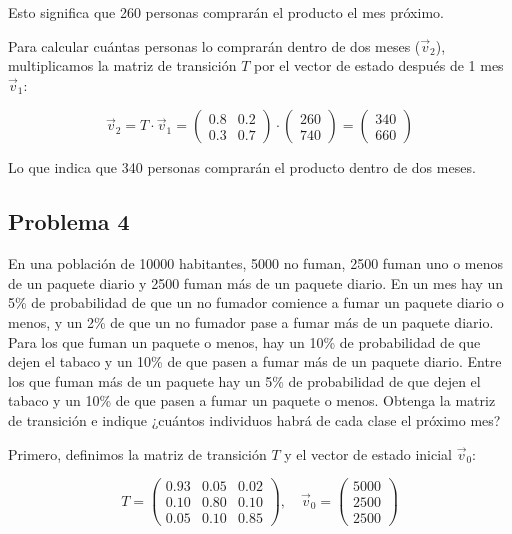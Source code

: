 \documentclass{article}
\begin{document}
Esto significa que 260 personas comprarán el producto el mes próximo.

Para calcular cuántas personas lo comprarán dentro de dos meses (\(\vec{v}_2\)), multiplicamos la matriz de transición \(T\) por el vector de estado después de 1 mes \(\vec{v}_1\):

\[
    \vec{v}_2 = T \cdot \vec{v}_1 = \begin{pmatrix}
        0.8 & 0.2 \\
        0.3 & 0.7
    \end{pmatrix}
    \cdot
    \begin{pmatrix}
        260 \\
        740
    \end{pmatrix}
    =
    \begin{pmatrix}
        340 \\
        660
    \end{pmatrix}
\]

Lo que indica que 340 personas comprarán el producto dentro de dos meses.


\subsection*{Problema 4}

En una población de 10000 habitantes, 5000 no fuman, 2500 fuman uno o menos de un paquete diario y 2500 fuman más de un paquete diario. En un mes hay un 5\% de probabilidad de que un no fumador comience a fumar un paquete diario o menos, y un 2\% de que un no fumador pase a fumar más de un paquete diario. Para los que fuman un paquete o menos, hay un 10\% de probabilidad de que dejen el tabaco y un 10\% de que pasen a fumar más de un paquete diario. Entre los que fuman más de un paquete hay un 5\% de probabilidad de que dejen el tabaco y un 10\% de que pasen a fumar un paquete o menos. Obtenga la matriz de transición e indique ¿cuántos individuos habrá de cada clase el próximo mes?

Primero, definimos la matriz de transición \(T\) y el vector de estado inicial \(\vec{v}_0\):

\[
    T = \begin{pmatrix}
        0.93 & 0.05 & 0.02 \\
        0.10 & 0.80 & 0.10 \\
        0.05 & 0.10 & 0.85
    \end{pmatrix},
    \quad
    \vec{v}_0 = \begin{pmatrix}
        5000 \\
        2500 \\
        2500
    \end{pmatrix}
\]
\end{document}

